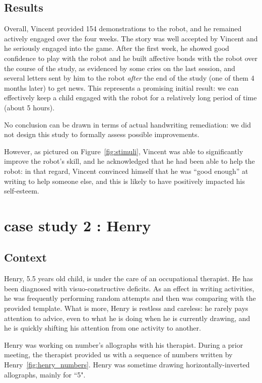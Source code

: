 \documentclass{sig-alternate}
\begin{document}
\subsection{Results}
Overall, Vincent provided 154 demonstrations to the robot, and he remained
actively engaged over the four weeks. The story was well accepted by Vincent and
he seriously engaged into the game. After the first week, he showed good
confidence to play with the robot and he built affective bonds with the robot
over the course of the study, as evidenced by some cries on the last session,
and several letters sent by him to the robot \emph{after} the end of the study
(one of them 4 months later) to get news. This represents a promising initial
result: we can effectively keep a child engaged with the robot for a relatively
long period of time (about 5 hours).

No conclusion can be drawn in terms of actual handwriting remediation: we did
not design this study to formally assess possible improvements.

However, as pictured on Figure~\ref{fig:stimuli}, Vincent was able to
significantly improve the robot's skill, and he acknowledged that he had been
able to help the robot: in that regard, Vincent convinced himself that he was
``good enough'' at writing to help someone else, and this is likely to have
positively impacted his self-esteem.



\section{case study 2 : Henry}\label{henry}

\subsection{Context}

Henry, 5.5 years old child, is under the care of an occupational
therapist. He has been diagnosed with visuo-constructive deficits.
As an effect in writing activities, he was frequently performing random attempts and then was comparing
with the provided template. What is more, Henry is restless and careless: he
rarely pays attention to
advice, even to what he is doing when he is currently drawing, and he is
quickly shifting his attention from one activity to another.

Henry was working on number's allographs with his therapist. During a prior
meeting, the therapist provided us with a sequence of numbers
written by Henry~\ref{fig:henry_numbers}. Henry was sometime drawing
horizontally-inverted allographs, mainly for ``5".
\end{document}
